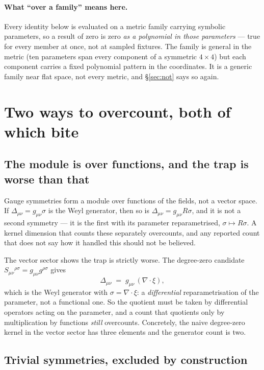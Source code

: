 \documentclass[11pt]{article}
\theoremstyle{definition}
\theoremstyle{remark}
\begin{document}
\paragraph{What ``over a family'' means here.}
Every identity below is evaluated on a metric family carrying symbolic
parameters, so a result of zero is zero \emph{as a polynomial in those
parameters} --- true for every member at once, not at sampled fixtures.  The
family is general in the metric (ten parameters span every component of a
symmetric \(4\times4\)) but each component carries a fixed polynomial pattern
in the coordinates.  It is a generic family near flat space, not every metric,
and \S\ref{sec:not} says so again.

\section{Two ways to overcount, both of which bite}
\label{sec:traps}

\subsection{The module is over functions, and the trap is worse than that}

Gauge symmetries form a module over functions of the fields, not a vector
space.  If \(\Delta_{\mu\nu}=g_{\mu\nu}\sigma\) is the Weyl generator, then so
is \(\Delta_{\mu\nu}=g_{\mu\nu}R\sigma\), and it is not a second symmetry ---
it is the first with its parameter reparametrised, \(\sigma\mapsto R\sigma\).
A kernel dimension that counts these separately overcounts, and any reported
count that does not say how it handled this should not be believed.

The vector sector shows the trap is strictly worse.  The degree-zero candidate
\(S_{\mu\nu}{}^{\rho\sigma}=g_{\mu\nu}g^{\rho\sigma}\) gives
\[
  \Delta_{\mu\nu} \;=\; g_{\mu\nu}\,(\nabla\!\cdot\!\xi),
\]
which is the Weyl generator with \(\sigma=\nabla\!\cdot\!\xi\): a
\emph{differential} reparametrisation of the parameter, not a functional one.
So the quotient must be taken by differential operators acting on the
parameter, and a count that quotients only by multiplication by functions
\emph{still} overcounts.  Concretely, the naive degree-zero kernel in the
vector sector has three elements and the generator count is two.

\subsection{Trivial symmetries, excluded by construction}
\end{document}
